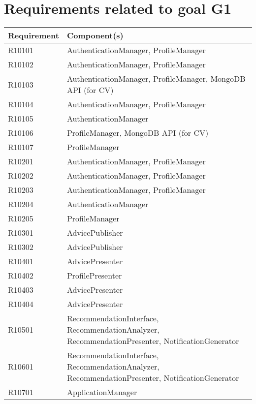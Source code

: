 	\section{Requirements related to goal G1}
			\begin{table}[H]
				\begin{tabular}{ | m{2.6cm} | m{9cm} | } 
					\hline
					\textbf {Requirement} & \textbf{Component(s)} \\
					\hline
						R10101 & AuthenticationManager, ProfileManager\\
					\hline
						R10102 & AuthenticationManager, ProfileManager \\
					\hline
						R10103 & AuthenticationManager, ProfileManager, MongoDB API (for CV)\\
					\hline
						R10104 & AuthenticationManager, ProfileManager\\
					\hline
						R10105 & AuthenticationManager \\
					\hline
						R10106 & ProfileManager, MongoDB API (for CV) \\
					\hline
						R10107 & ProfileManager \\
					\hline
						R10201 & AuthenticationManager, ProfileManager \\
					\hline
						R10202 & AuthenticationManager, ProfileManager \\
					\hline
						R10203 & AuthenticationManager, ProfileManager \\
					\hline
						R10204 & AuthenticationManager \\
					\hline
						R10205 & ProfileManager \\
					\hline
						R10301 & AdvicePublisher \\
					\hline
						R10302 & AdvicePublisher \\
					\hline
						R10401 & AdvicePresenter \\
					\hline
						R10402 & ProfilePresenter \\
					\hline
						R10403 & AdvicePresenter \\
					\hline
						R10404 & AdvicePresenter \\
					\hline
						R10501 & RecommendationInterface, RecommendationAnalyzer, RecommendationPresenter, NotificationGenerator\\
					\hline
						R10601 & RecommendationInterface, RecommendationAnalyzer, RecommendationPresenter, NotificationGenerator\\
					\hline
						R10701 & ApplicationManager \\

\end{tabular}
\end{table}
